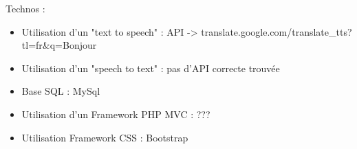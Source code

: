\documentclass[12pt,a4paper]{report}
\begin{document}
Technos :
\begin{itemize}
\item Utilisation d'un "text to speech" : API -> translate.google.com/translate_tts?tl=fr&q=Bonjour
\item Utilisation d'un "speech to text" : pas d'API correcte trouvée
\item Base SQL : MySql
\item Utilisation d'un Framework PHP MVC : ???
\item Utilisation Framework CSS : Bootstrap
\end{itemize}





\end{document}
